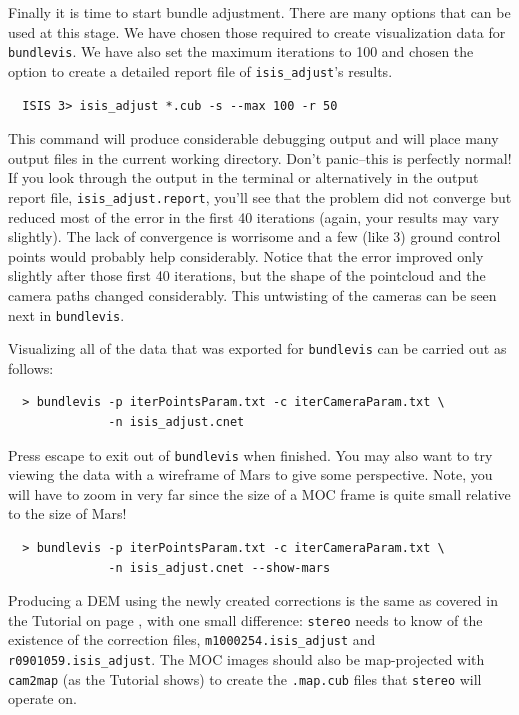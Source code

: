 Finally it is time to start bundle adjustment. There are many options
that can be used at this stage.  We have chosen those required to
create visualization data for \texttt{bundlevis}.  We have also set
the maximum iterations to 100 and chosen the option to create a
detailed report file of \texttt{isis\_adjust}'s results.

\begin{verbatim}
  ISIS 3> isis_adjust *.cub -s --max 100 -r 50
\end{verbatim}

This command will produce considerable debugging output and will
place many output files in the current working directory. Don't
panic--this is perfectly normal! If you look through the output in
the terminal or alternatively in the output report file,
\texttt{isis\_adjust.report}, you'll see that the problem did not
converge but reduced most of the error in the first 40 iterations
(again, your results may vary slightly). The lack of convergence
is worrisome and a few (like 3) ground control points would probably
help considerably.  Notice that the error improved only slightly
after those first 40 iterations, but the shape of the pointcloud and
the camera paths changed considerably. This untwisting of the
cameras can be seen next in \texttt{bundlevis}.

Visualizing all of the data that was exported for \texttt{bundlevis}
can be carried out as follows:

\begin{verbatim}
  > bundlevis -p iterPointsParam.txt -c iterCameraParam.txt \
              -n isis_adjust.cnet
\end{verbatim}

Press escape to exit out of \texttt{bundlevis} when finished.  You may
also want to try viewing the data with a wireframe of Mars to give
some perspective. Note, you will have to zoom in very far since the
size of a MOC frame is quite small relative to the size of Mars!

\begin{verbatim}
  > bundlevis -p iterPointsParam.txt -c iterCameraParam.txt \
              -n isis_adjust.cnet --show-mars
\end{verbatim}

Producing a DEM using the newly created corrections is the same as
covered in the Tutorial on page \pageref{ch:tutorial}, with one small
difference: \texttt{stereo} needs to know of the existence of the
correction files, \texttt{m1000254.isis\_adjust} and
\texttt{r0901059.isis\_adjust}.  The \ac{MOC} images should also be 
map-projected with \texttt{cam2map} (as the Tutorial shows) to create
the \texttt{.map.cub} files that \texttt{stereo} will operate on.

